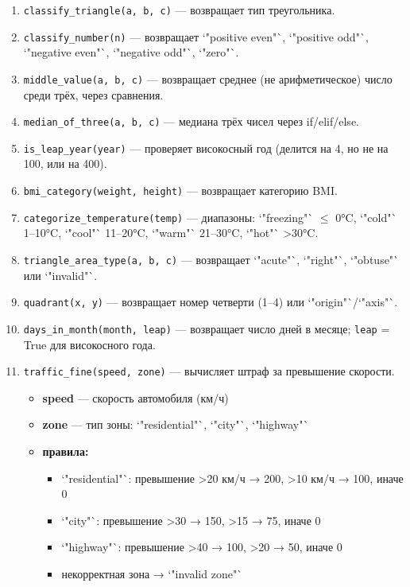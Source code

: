 \begin{enumerate}
    \item \texttt{classify\_triangle(a, b, c)} — возвращает тип треугольника.  
    \item \texttt{classify\_number(n)} — возвращает `"positive even"`, `"positive odd"`, `"negative even"`, `"negative odd"`, `"zero"`.  
    \item \texttt{middle\_value(a, b, c)} — возвращает среднее (не арифметическое) число среди трёх, через сравнения.  
    \item \texttt{median\_of\_three(a, b, c)} — медиана трёх чисел через if/elif/else.  
    \item \texttt{is\_leap\_year(year)} — проверяет високосный год (делится на 4, но не на 100, или на 400).  
    \item \texttt{bmi\_category(weight, height)} — возвращает категорию BMI.  
    \item \texttt{categorize\_temperature(temp)} — диапазоны: `"freezing"` $\leqslant$ 0°C, `"cold"` 1–10°C, `"cool"` 11–20°C, `"warm"` 21–30°C, `"hot"` >30°C.  
    \item \texttt{triangle\_area\_type(a, b, c)} — возвращает `"acute"`, `"right"`, `"obtuse"` или `"invalid"`.  
    \item \texttt{quadrant(x, y)} — возвращает номер четверти (1–4) или `"origin"`/`"axis"`.  
    \item \texttt{days\_in\_month(month, leap)} — возвращает число дней в месяце; \texttt{leap} = True для високосного года.  
    \item \texttt{traffic\_fine(speed, zone)} — вычисляет штраф за превышение скорости.  
    \begin{itemize}
        \item \textbf{speed} — скорость автомобиля (км/ч)  
        \item \textbf{zone} — тип зоны: `"residential"`, `"city"`, `"highway"`  
        \item \textbf{правила:}  
        \begin{itemize}
            \item `"residential"`: превышение >20 км/ч → 200, >10 км/ч → 100, иначе 0  
            \item `"city"`: превышение >30 → 150, >15 → 75, иначе 0  
            \item `"highway"`: превышение >40 → 100, >20 → 50, иначе 0  
            \item некорректная зона → `"invalid zone"`  
        \end{itemize}

\end{itemize}
\end{enumerate}
